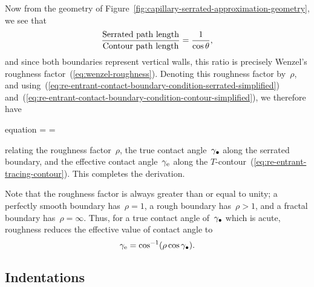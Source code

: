 Now from the geometry
of Figure~\ref{fig:capillary-serrated-approximation-geometry},
we see that
\begin{equation}
  \frac{\textnormal{Serrated path length}}{\textnormal{Contour path length}}
   = \frac{1}{\cos\theta},
   \label{eq:path-length-ratio}
\end{equation}
and since both boundaries represent vertical walls,
this ratio is precisely Wenzel's roughness factor~(\ref{eq:wenzel-roughness}).
Denoting this roughness factor by~$\rho$,
and using~(\ref{eq:re-entrant-contact-boundary-condition-serrated-simplified})
and~(\ref{eq:re-entrant-contact-boundary-condition-contour-simplified}),
we therefore have
\begin{important}{equation}
  \rho =  = \frac{\cos\gamma_\eff}{\cos\gamma_\tr}
  \label{eq:roughness-cosine-ratio}
\end{important}
relating the roughness factor~$\rho$,
the true contact angle~$\gamma_\bullet$ along the serrated boundary,
and the effective contact angle~$\gamma_{\mathrm{e}}$
along the $T$-contour~(\ref{eq:re-entrant-tracing-contour}).
This completes the derivation.

Note that the roughness factor is always greater than or equal to unity;
a perfectly smooth boundary has~$\rho = 1$,
a rough boundary has~$\rho > 1$,
and a fractal boundary has~$\rho = \infty$.
Thus, for a true contact angle of~$\gamma_\bullet$ which is acute,
roughness reduces the effective value of contact angle to
\begin{equation}
  \gamma_\eff = \cos^{-1} \roundbr*{\rho \cos\gamma_\tr}.
  \label{eq:effective-contact-angle}
\end{equation}

\subsection{Indentations}
\label{sec:re-entrant.dip-coating.indentations}

\begin{figure}
\end{figure}

